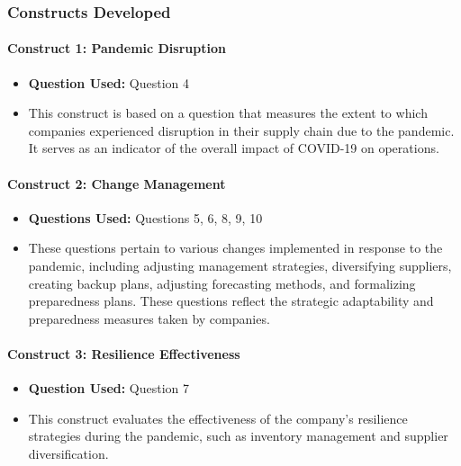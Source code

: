 \subsubsection{Constructs Developed}

\paragraph*{Construct 1: Pandemic Disruption}

\begin{itemize}
    \item \textbf{Question Used:} Question 4
    \item This construct is based on a question that measures the extent to which companies experienced disruption in their supply chain due to the pandemic. It serves as an indicator of the overall impact of COVID-19 on operations.
\end{itemize}

\paragraph*{Construct 2: Change Management}

\begin{itemize}
    \item \textbf{Questions Used:} Questions 5, 6, 8, 9, 10
    \item These questions pertain to various changes implemented in response to the pandemic, including adjusting management strategies, diversifying suppliers, creating backup plans, adjusting forecasting methods, and formalizing preparedness plans. These questions reflect the strategic adaptability and preparedness measures taken by companies.
\end{itemize}

\paragraph*{Construct 3: Resilience Effectiveness}

\begin{itemize}
    \item \textbf{Question Used:} Question 7
    \item This construct evaluates the effectiveness of the company’s resilience strategies during the pandemic, such as inventory management and supplier diversification.
\end{itemize}



